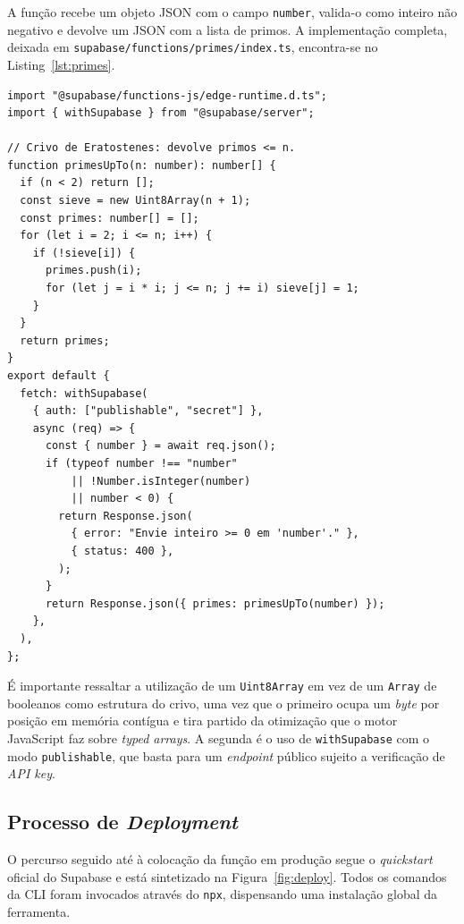 \documentclass[conference]{IEEEtran}
\begin{document}
A função recebe um objeto JSON com o campo \texttt{number}, valida-o como inteiro não negativo e devolve um JSON com a lista de primos. A implementação completa, deixada em \texttt{supabase/functions/primes/index.ts}, encontra-se no Listing~\ref{lst:primes}.

\begin{lstlisting}[basicstyle=\ttfamily\scriptsize, caption={Função \textit{serverless} \texttt{primes}: crivo de Eratóstenes exposto como \textit{endpoint} HTTP.}, label={lst:primes}]
import "@supabase/functions-js/edge-runtime.d.ts";
import { withSupabase } from "@supabase/server";

// Crivo de Eratostenes: devolve primos <= n.
function primesUpTo(n: number): number[] {
  if (n < 2) return [];
  const sieve = new Uint8Array(n + 1);
  const primes: number[] = [];
  for (let i = 2; i <= n; i++) {
    if (!sieve[i]) {
      primes.push(i);
      for (let j = i * i; j <= n; j += i) sieve[j] = 1;
    }
  }
  return primes;
}
export default {
  fetch: withSupabase(
    { auth: ["publishable", "secret"] },
    async (req) => {
      const { number } = await req.json();
      if (typeof number !== "number"
          || !Number.isInteger(number)
          || number < 0) {
        return Response.json(
          { error: "Envie inteiro >= 0 em 'number'." },
          { status: 400 },
        );
      }
      return Response.json({ primes: primesUpTo(number) });
    },
  ),
};
\end{lstlisting}

É importante ressaltar a utilização de um \texttt{Uint8Array} em vez de um \texttt{Array} de booleanos como estrutura do crivo, uma vez que o primeiro ocupa um \textit{byte} por posição em memória contígua e tira partido da otimização que o motor JavaScript faz sobre \textit{typed arrays}. A segunda é o uso de \texttt{withSupabase} com o modo \texttt{publishable}, que basta para um \textit{endpoint} público sujeito a verificação de \textit{API key}.

\subsection{Processo de \textit{Deployment}}
O percurso seguido até à colocação da função em produção segue o \textit{quickstart} oficial do Supabase \cite{supabasequickstart} e está sintetizado na Figura~\ref{fig:deploy}. Todos os comandos da CLI foram invocados através do \texttt{npx}, dispensando uma instalação global da ferramenta.
\end{document}
